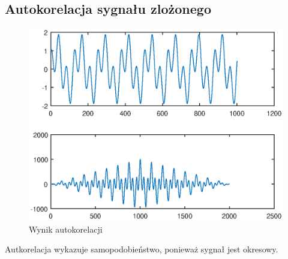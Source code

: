 \documentclass[12pt,titlepage]{report}
\begin{document}
\subsection{Autokorelacja sygnału zlożonego}
\begin{figure}[!h]
	\centering
	\includegraphics[scale=0.6]{../cw57_output}
	\caption{Wynik autokorelacji}
\end{figure}
Autkorelacja wykazuje samopodobieństwo, ponieważ sygnał jest okresowy.
\end{document}
